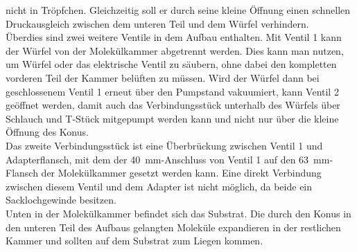 nicht in Tröpfchen. Gleichzeitig soll er durch seine kleine Öffnung einen schnellen Druckausgleich zwischen
dem unteren Teil und dem Würfel verhindern.
 \\
Überdies sind zwei weitere Ventile in dem Aufbau enthalten. Mit Ventil 1 kann der Würfel von der
Molekülkammer abgetrennt werden. Dies kann man nutzen, um Würfel oder das elektrische Ventil zu säubern, ohne
dabei den kompletten vorderen Teil der Kammer belüften zu müssen. Wird der Würfel dann bei
geschlossenem Ventil 1 erneut über den Pumpstand vakuumiert, kann Ventil 2 geöffnet werden, damit auch das Verbindungsstück
unterhalb des Würfels über Schlauch und T-Stück mitgepumpt werden kann und nicht nur über die kleine Öffnung
des Konus.
\\
Das zweite Verbindungsstück ist eine Überbrückung zwischen Ventil 1 und Adapterflansch, mit dem
der \SI{40}{mm}-Anschluss von Ventil 1 auf den \SI{63}{mm}-Flansch der Molekülkammer gesetzt werden
kann. Eine direkt Verbindung zwischen diesem Ventil und dem Adapter ist nicht möglich, da beide ein
Sacklochgewinde besitzen.
\\
Unten in der Molekülkammer befindet sich das Substrat. Die durch den Konus in den unteren Teil des Aufbaus
gelangten Moleküle expandieren in der restlichen Kammer und sollten auf dem Substrat zum Liegen
kommen.

\FloatBarrier

